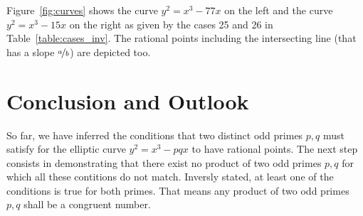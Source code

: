\documentclass[12pt]{amsart}
\theoremstyle{definition}
\begin{document}
	Figure~\ref{fig:curves} shows the curve $y^2=x^3-77x$ on the left and the curve $y^2=x^3-15x$ on the right as given by the cases 25 and 26 in Table~\ref{table:cases_inv}. The rational points including the intersecting line (that has a slope $\nicefrac{a}{b}$) are depicted too.
	
	\section{Conclusion and Outlook}
	\label{outlook}
	So far, we have inferred the conditions that two distinct odd primes $p,q$ must satisfy for the elliptic curve $y^2=x^3-pqx$ to have rational points. The next step consists in demonstrating that there exist no product of two odd primes $p,q$ for which all these contitions do not match. Inversly stated, at least one of the conditions is true for both primes. That means any product of  two odd primes $p,q$ shall be a congruent number.
	
	
	\newpage
	\vspace{1em}
	
	
\end{document}
